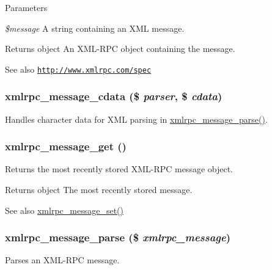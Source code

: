 \begin{DoxyParams}{Parameters}
\item[{\em \$message}]A string containing an XML message.\end{DoxyParams}
\begin{DoxyReturn}{Returns}
object An XML-\/RPC object containing the message.
\end{DoxyReturn}
\begin{DoxySeeAlso}{See also}
\href{http://www.xmlrpc.com/spec}{\tt http://www.xmlrpc.com/spec} 
\end{DoxySeeAlso}
\hypertarget{xmlrpc_8inc_a74f16ef34915c5b73e28a69a02e773c8}{
\subsubsection[{xmlrpc\_\-message\_\-cdata}]{\setlength{\rightskip}{0pt plus 5cm}xmlrpc\_\-message\_\-cdata (\$ {\em parser}, \/  \$ {\em cdata})}}
\label{xmlrpc_8inc_a74f16ef34915c5b73e28a69a02e773c8}
Handles character data for XML parsing in \hyperlink{xmlrpc_8inc_ad105844dad0a30254611d32284350dc4}{xmlrpc\_\-message\_\-parse()}. \hypertarget{xmlrpc_8inc_a8ee9baa0e35c9f75da4705403ec1c502}{
\subsubsection[{xmlrpc\_\-message\_\-get}]{\setlength{\rightskip}{0pt plus 5cm}xmlrpc\_\-message\_\-get ()}}
\label{xmlrpc_8inc_a8ee9baa0e35c9f75da4705403ec1c502}
Returns the most recently stored XML-\/RPC message object.

\begin{DoxyReturn}{Returns}
object The most recently stored message.
\end{DoxyReturn}
\begin{DoxySeeAlso}{See also}
\hyperlink{xmlrpc_8inc_a82e3428ca6ed8e4d1ddc377fbc77d8dc}{xmlrpc\_\-message\_\-set()} 
\end{DoxySeeAlso}
\hypertarget{xmlrpc_8inc_ad105844dad0a30254611d32284350dc4}{
\subsubsection[{xmlrpc\_\-message\_\-parse}]{\setlength{\rightskip}{0pt plus 5cm}xmlrpc\_\-message\_\-parse (\$ {\em xmlrpc\_\-message})}}
\label{xmlrpc_8inc_ad105844dad0a30254611d32284350dc4}
Parses an XML-\/RPC message.

